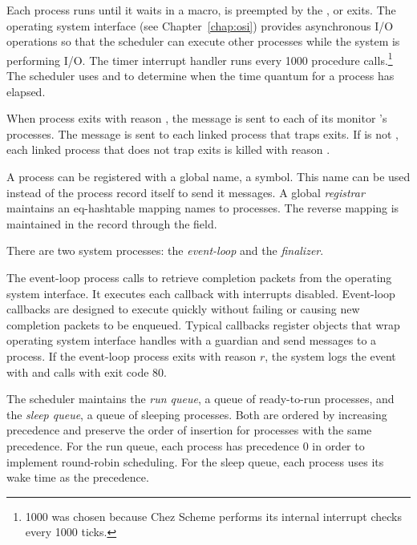 Each process runs until it waits in a  macro, is
preempted by the , or exits.  The
operating system interface (see Chapter~\ref{chap:osi}) provides
asynchronous I/O operations so that the scheduler can execute other
processes while the system is performing I/O.  The timer interrupt
handler runs every 1000 procedure calls.\footnote{1000 was chosen
  because Chez Scheme performs its internal interrupt checks every
  1000 ticks.} The scheduler uses  and
 to determine when the time quantum for a
process has elapsed.

When process  exits with reason , the message
 is sent to each of its
monitor 's  processes.  The message
 is sent to each linked process that
traps exits. If  is not , each linked process
that does not trap exits is killed with reason .

A process can be registered with a global name, a symbol. This name
can be used instead of the process record itself to send it messages.
A global \emph{registrar} maintains an eq-hashtable
mapping names to processes. The reverse mapping is maintained in the
 record through the  field.

There are two system processes: the
\emph{event-loop} and the
\emph{finalizer}.

The event-loop process calls  to
retrieve completion packets from the operating system interface.  It
executes each callback with interrupts disabled.  Event-loop callbacks
are designed to execute quickly without failing or causing new
completion packets to be enqueued. Typical callbacks register objects
that wrap operating system interface handles with a guardian and send
messages to a process. If the event-loop process exits with reason
$r$, the system logs the event
 with
 and calls 
with exit code 80.

The scheduler maintains the \emph{run queue}, a queue
of ready-to-run processes, and the \emph{sleep queue}, a queue of sleeping processes. Both are ordered by
increasing precedence and preserve the order of insertion for
processes with the same precedence. For the run queue, each process
has precedence 0 in order to implement round-robin scheduling. For the
sleep queue, each process uses its wake time as the precedence.

